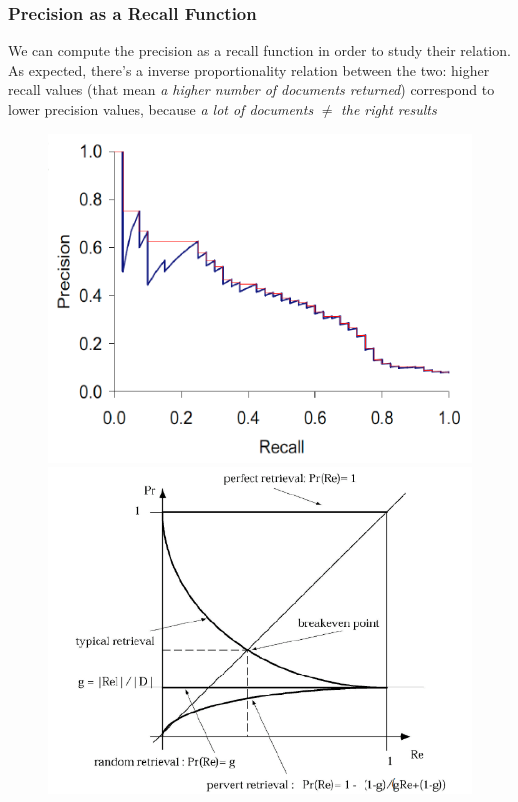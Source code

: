 \documentclass{article}
\begin{document}
			\subsubsection{Precision as a Recall Function}
				We can compute the precision as a recall function in order to study their relation. As expected, there's a inverse proportionality relation between the two: higher recall values (that mean \textit{a higher number of documents returned}) correspond to lower precision values, because \textit{a lot of documents} $\neq$ \textit{the right results}
				\begin{figure}[H]
					\centering
					\begin{minipage}{0.45\textwidth}
						\includegraphics[width = \textwidth]{./images/preciseFunction.png}	
					\end{minipage}
					\begin{minipage}{0.45\textwidth}
						\includegraphics[width = \textwidth]{./images/asymptFunction.png}
					\end{minipage}
				\end{figure}
\end{document}
